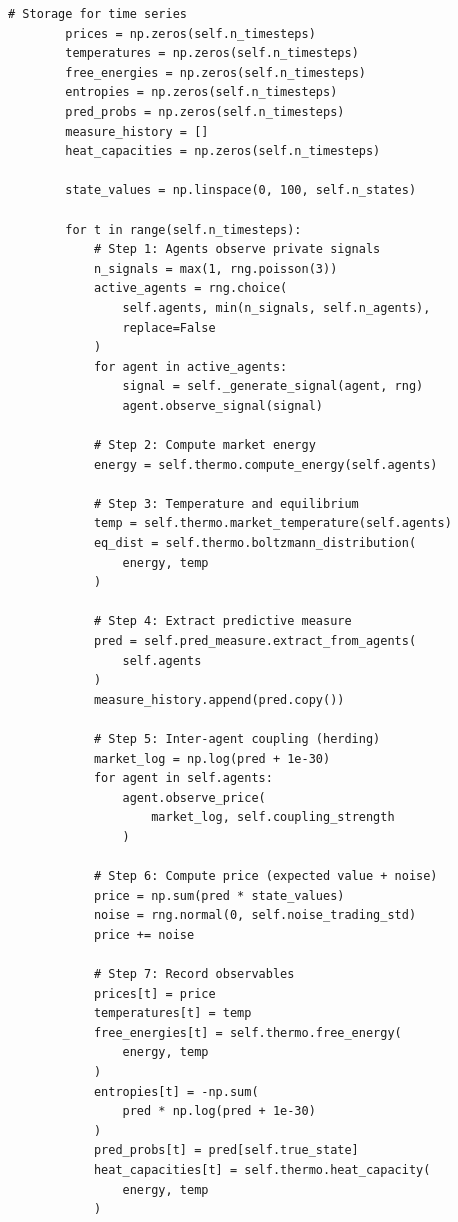 \documentclass[12pt,a4paper]{article}
\theoremstyle{definition}
\begin{document}
\begin{lstlisting}[caption={Market Simulator --- Full UPMF dynamics (Part~III, Thm.~3.2)},label=lst:simulator]
        # Storage for time series
        prices = np.zeros(self.n_timesteps)
        temperatures = np.zeros(self.n_timesteps)
        free_energies = np.zeros(self.n_timesteps)
        entropies = np.zeros(self.n_timesteps)
        pred_probs = np.zeros(self.n_timesteps)
        measure_history = []
        heat_capacities = np.zeros(self.n_timesteps)
        
        state_values = np.linspace(0, 100, self.n_states)
        
        for t in range(self.n_timesteps):
            # Step 1: Agents observe private signals
            n_signals = max(1, rng.poisson(3))
            active_agents = rng.choice(
                self.agents, min(n_signals, self.n_agents),
                replace=False
            )
            for agent in active_agents:
                signal = self._generate_signal(agent, rng)
                agent.observe_signal(signal)
            
            # Step 2: Compute market energy
            energy = self.thermo.compute_energy(self.agents)
            
            # Step 3: Temperature and equilibrium
            temp = self.thermo.market_temperature(self.agents)
            eq_dist = self.thermo.boltzmann_distribution(
                energy, temp
            )
            
            # Step 4: Extract predictive measure
            pred = self.pred_measure.extract_from_agents(
                self.agents
            )
            measure_history.append(pred.copy())
            
            # Step 5: Inter-agent coupling (herding)
            market_log = np.log(pred + 1e-30)
            for agent in self.agents:
                agent.observe_price(
                    market_log, self.coupling_strength
                )
            
            # Step 6: Compute price (expected value + noise)
            price = np.sum(pred * state_values)
            noise = rng.normal(0, self.noise_trading_std)
            price += noise
            
            # Step 7: Record observables
            prices[t] = price
            temperatures[t] = temp
            free_energies[t] = self.thermo.free_energy(
                energy, temp
            )
            entropies[t] = -np.sum(
                pred * np.log(pred + 1e-30)
            )
            pred_probs[t] = pred[self.true_state]
            heat_capacities[t] = self.thermo.heat_capacity(
                energy, temp
            )
        

\end{lstlisting}
\end{document}
